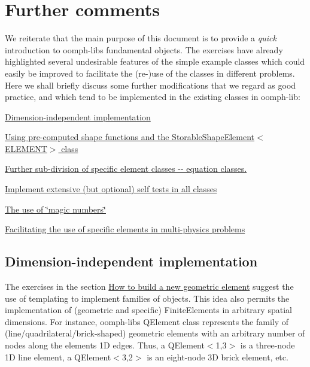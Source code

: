 \hypertarget{index_comments}{}\section{Further comments}\label{index_comments}
We reiterate that the main purpose of this document is to provide a {\itshape quick} introduction to {\ttfamily oomph-\/lib\textquotesingle{}s} fundamental objects. The exercises have already highlighted several undesirable features of the simple example classes which could easily be improved to facilitate the (re-\/)use of the classes in different problems. Here we shall briefly discuss some further modifications that we regard as good practice, and which tend to be implemented in the existing classes in {\ttfamily oomph-\/lib}\+:
\begin{DoxyItemize}
\item \hyperlink{index_dim_independent}{Dimension-\/independent implementation}
\item \hyperlink{index_pre_compute_psi}{Using pre-\/computed shape functions and the Storable\+Shape\+Element$<$\+E\+L\+E\+M\+E\+N\+T$>$ class}
\item \hyperlink{index_equation_classes}{Further sub-\/division of specific element classes -\/-\/ equation classes.}
\item \hyperlink{index_paranoia}{Implement extensive (but optional) self tests in all classes}
\item \hyperlink{index_magic}{The use of \char`\"{}magic numbers\char`\"{}}
\item \hyperlink{index_multi_physics}{Facilitating the use of specific elements in multi-\/physics problems}
\end{DoxyItemize}



\hypertarget{index_dim_independent}{}\subsection{Dimension-\/independent implementation}\label{index_dim_independent}
The exercises in the section \hyperlink{index_FEgeom}{How to build a new geometric element} suggest the use of templating to implement families of objects. This idea also permits the implementation of (geometric and specific) {\ttfamily Finite\+Elements} in arbitrary spatial dimensions. For instance, {\ttfamily oomph-\/lib\textquotesingle{}s} {\ttfamily Q\+Element} class represents the family of (line/quadrilateral/brick-\/shaped) geometric elements with an arbitrary number of nodes along the elements\textquotesingle{} 1D edges. Thus, a {\ttfamily Q\+Element$<$1,3$>$} is a three-\/node 1D line element, a {\ttfamily Q\+Element$<$3,2$>$} is an eight-\/node 3D brick element, etc.


